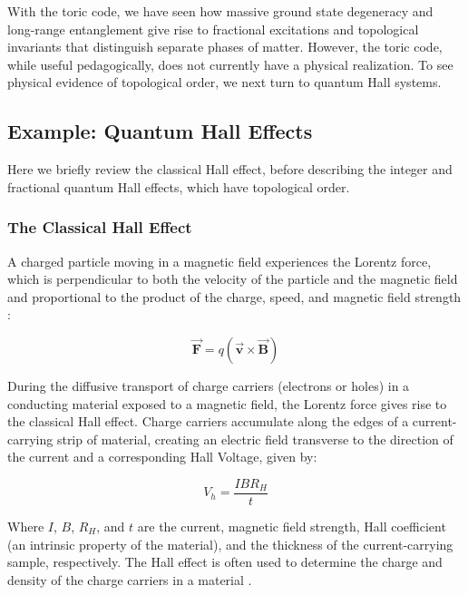 With the toric code, we have seen how massive ground state degeneracy and long-range entanglement give rise to fractional excitations and topological invariants that distinguish separate phases of matter. However, the toric code, while useful pedagogically, does not currently have a physical realization. To see physical evidence of topological order, we next turn to quantum Hall systems.

\subsection{Example: Quantum Hall Effects}

Here we briefly review the classical Hall effect, before describing the integer and fractional quantum Hall effects, which have topological order.

\subsubsection{The Classical Hall Effect}
A charged particle moving in a magnetic field experiences the Lorentz force, which is perpendicular to both the velocity of the particle and the magnetic field and proportional to the product of the charge, speed, and magnetic field strength \cite{Griffiths1999}:

\begin{equation}
\vec{\mathbf{F}} = q(\vec{\mathbf{v}} \times \vec{\mathbf{B}})
\end{equation}

During the diffusive transport of charge carriers (electrons or holes) in a conducting material exposed to a magnetic field, the Lorentz force gives rise to the classical Hall effect. Charge carriers accumulate along the edges of a current-carrying strip of material, creating an electric field transverse to the direction of the current and a corresponding Hall Voltage, given by:

\begin{equation}
V_{h} = \frac{I B R_{H}}{t}
\end{equation}

Where $I$,  $B$, $R_{H}$, and $t$ are the current, magnetic field strength, Hall coefficient (an intrinsic property of the material), and the thickness of the current-carrying sample, respectively. The Hall effect is often used to determine the charge and density of the charge carriers in a material \cite{Pierret2002}.

